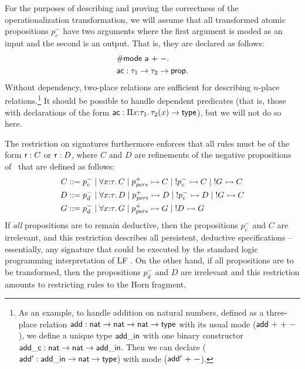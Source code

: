 For the purposes of describing and proving the correctness of the
operationalization transformation, we will assume that all transformed
atomic propositions $p_c^-$ have two arguments where the first
argument is moded as an input and the second is an output. That is,
they are declared as follows:
\begin{align*}
& {\sf \#mode~a~{+}~{-}}.\\
& {\sf ac} : \tau_1 \rightarrow \tau_2 \rightarrow {\sf prop}.
\end{align*}
Without dependency, two-place relations are sufficient for describing
$n$-place relations.\footnote{As an example, to handle addition on
  natural numbers, defined as a three-place relation ${\sf add} : {\sf
    nat} \rightarrow {\sf nat} \rightarrow {\sf nat} \rightarrow {\sf
    type}$ with its usual mode (${\sf add}~{+}~{+}~{-}$), we define a
  unique type ${\sf add\_in}$ with one binary constructor ${\sf
    add\_c} : {\sf nat} \rightarrow {\sf nat} \rightarrow {\sf
    add\_in}$. Then we can declare (${\sf add'} : {\sf add\_in}
  \rightarrow {\sf nat} \rightarrow {\sf type}$) with mode (${\sf
    add'}~{+}~{-}$).}  It should be possible to handle dependent
predicates (that is, those with declarations of the form ${\sf ac} :
\Pi x{:}\tau_1.\,\tau_2(x) \rightarrow {\sf type}$), but we will not do
so here.

The restriction on signatures furthermore enforces that all rules must
be of the form ${\sf r} : C$ or ${\sf r} : D$, where $C$ and $D$ are
refinements of the negative propositions of \sls~that are defined as
follows:
\begin{align*}
C & ::= p^-_{c} 
    \mid \forall x{:}\tau.\, C
    \mid p^+_{\it pers} \rightarrowtail C
    \mid {!}p^-_c \rightarrowtail C
    \mid {!}G \rightarrowtail C \\
D & ::= p^-_{d}
    \mid \forall x{:}\tau.\, D
    \mid p^+_{\it pers} \rightarrowtail D
    \mid {!}p^-_c \rightarrowtail D
    \mid {!}G \rightarrowtail C \\
G & ::= p^-_d 
    \mid \forall x{:}\tau.\, G
    \mid p^+_{\it pers} \rightarrowtail G
    \mid {!}D \rightarrowtail G
\end{align*}
If {\it all} propositions are to remain deductive, then the
propositions $p^-_c$ and $C$ are irrelevant, and this restriction
describes all persistent, deductive specifications -- essentially, any
signature that could be executed by the standard logic programming
interpretation of LF \cite{pfenning89elf}. On the other hand, if all
propositions are to be transformed, then the propositions $p^-_d$ and
$D$ are irrelevant and this restriction amounts to restricting
rules to the Horn fragment.

